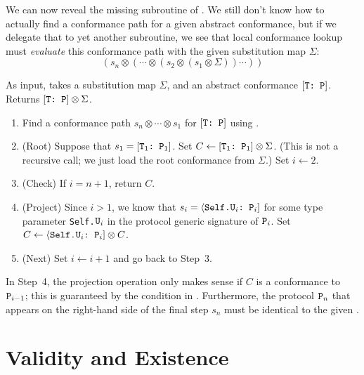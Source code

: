 \documentclass[../generics]{subfiles}
\begin{document}
We can now reveal the missing subroutine of .
We still don't know how to actually find a conformance path for a given abstract conformance, but if we delegate that to yet another subroutine, we see that local conformance lookup must \emph{evaluate} this conformance path with the given substitution map $\Sigma$:
\[(s_n\otimes(\cdots\otimes (s_2 \otimes (s_1 \otimes \Sigma)) \cdots ))\]

\begin{algorithm}\label{local conformance lookup algorithm}
As input, takes a substitution map $\Sigma$, and an abstract conformance $[\texttt{T:~P}]$. Returns $[\texttt{T:~P}]\otimes\Sigma$.
\begin{enumerate}
\item Find a conformance path $s_n\otimes \cdots \otimes s_1$ for $[\texttt{T:~P}]$ using .
\item (Root) Suppose that $s_1=[\texttt{$\texttt{T}_1$:~$\texttt{P}_1$}]$. Set $C\leftarrow [\texttt{$\texttt{T}_1$:~$\texttt{P}_1$}] \otimes \Sigma$. (This is not a recursive call; we just load the root conformance from $\Sigma$.) Set $i\leftarrow 2$.
\item (Check) If $i=n+1$, return $C$.
\item (Project) Since $i>1$, we know that $s_i=\langle\texttt{Self.$\texttt{U}_i$:~$\texttt{P}_i$}]$ for some type parameter \texttt{Self.$\texttt{U}_i$} in the protocol generic signature of $\texttt{P}_i$. Set $C\leftarrow \langle\texttt{Self.$\texttt{U}_i$:~$\texttt{P}_i$}] \otimes C$.
\item (Next) Set $i\leftarrow i+1$ and go back to Step~3.
\end{enumerate}
\end{algorithm}

In Step~4, the projection operation only makes sense if $C$ is a conformance to $\texttt{P}_{i-1}$; this is guaranteed by the condition in . Furthermore, the protocol $\texttt{P}_n$ that appears on the right-hand side of the final step $s_n$ must be identical to the given \tP.

\section{Validity and Existence}\label{conformance paths exist}
\end{document}
